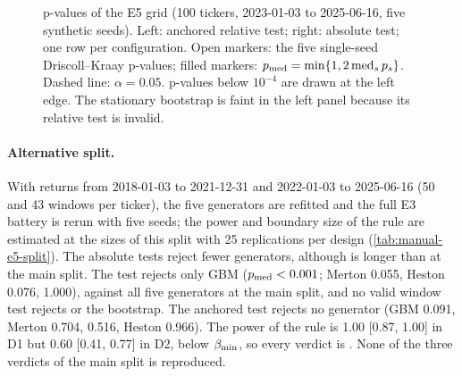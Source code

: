 \begin{table}[tbp]
  \centering
  \caption{Sensitivity of the E3 decisions to one-at-a-time changes of the pipeline (E5 grid;
    100 tickers, \TEST{} 2023-01-03 to 2025-06-16, five synthetic seeds, $\alpha=0.05$).}
  \label{tab:manual-e5-sensitivity}
  \small
\end{table}

\begin{figure}[tbp]
  \centering
  \caption{p-values of the E5 grid (100 tickers, \TEST{} 2023-01-03 to 2025-06-16, five synthetic
    seeds). Left: anchored relative test; right: absolute \WC{} test; one row per configuration.
    Open markers: the five single-seed Driscoll--Kraay p-values; filled markers:
    $p_{\mathrm{med}}=\min\{1,2\operatorname{med}_sp_s\}$. Dashed line: $\alpha=0.05$. p-values below $10^{-4}$ are drawn at
    the left edge. The stationary bootstrap is faint in the left panel because its relative test
    is invalid.}
  \label{fig:e5-sensitivity}
\end{figure}

\paragraph{Alternative split.}
With \TRAIN{} returns from 2018-01-03 to 2021-12-31 and \TEST{} 2022-01-03 to 2025-06-16 (50 and 43 windows
per ticker), the five generators are refitted and the full E3 battery is rerun with five seeds;
the power and boundary size of the rule are estimated at the sizes of this split with 25
replications per design (\cref{tab:manual-e5-split}). The absolute tests reject fewer
generators, although \TEST{} is longer than at the main split. The \WC{} test rejects only GBM
($p_{\mathrm{med}}<0.001$; Merton 0.055, Heston 0.076, \GARCHt{} 1.000), against all five generators at the
main split, and no valid window test rejects \GARCHt{} or the bootstrap. The anchored test rejects
no generator (GBM 0.091, Merton 0.704, \GARCHt{} 0.516, Heston 0.966). The power of the rule is
1.00 [0.87, 1.00] in D1 but 0.60 [0.41, 0.77] in D2, below $\beta_{\min}$, so every verdict is
\INCONCL{}. None of the three \BAD{} verdicts of the main split is reproduced.

